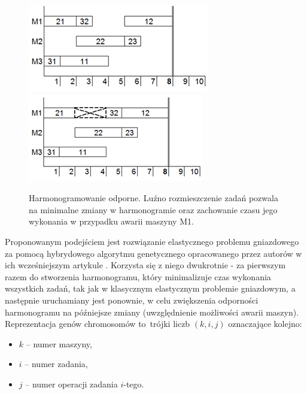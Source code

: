 \documentclass[printmode,oneside]{mgr}
\begin{document}
\begin{figure}[!ht]
\begin{center}
\includegraphics[width=1.0\linewidth]{rysunki/odporny_jobshopA.png}
\endminipage \hfill
{}%
\includegraphics[width=1.0\linewidth]{rysunki/odporny_jobshopB.png}
\endminipage
\caption[Harmonogramowanie odporne]{Harmonogramowanie odporne. Luźno rozmieszczenie zadań pozwala na minimalne zmiany w harmonogramie oraz zachowanie czasu jego wykonania w przypadku awarii maszyny M1.}
\label{rys_odporny_jobshop}
\end{center}
\end{figure}
Proponowanym podejściem jest rozwiązanie elastycznego problemu gniazdowego za pomocą hybrydowego algorytmu genetycznego opracowanego przez autorów \cite{RFJSRMB_ElMekkawy11} w ich wcześniejszym artykule \cite{AEHGAFJS_ElMekkawy11}. Korzysta się z niego dwukrotnie - za pierwszym razem do stworzenia harmonogramu, który minimalizuje czas wykonania wszystkich zadań, tak jak w klasycznym elastycznym problemie gniazdowym, a następnie uruchamiany jest ponownie, w celu zwiększenia odporności harmonogramu na późniejsze zmiany (uwzględnienie możliwości awarii maszyn). Reprezentacja genów chromosomów to~trójki liczb $(k,i,j)$ oznaczające kolejno:
\begin{itemize}
    \item $k$ -- numer maszyny,
    \item $i$ -- numer zadania,
    \item $j$ -- numer operacji zadania $i$-tego.
\end{itemize}
\end{document}
